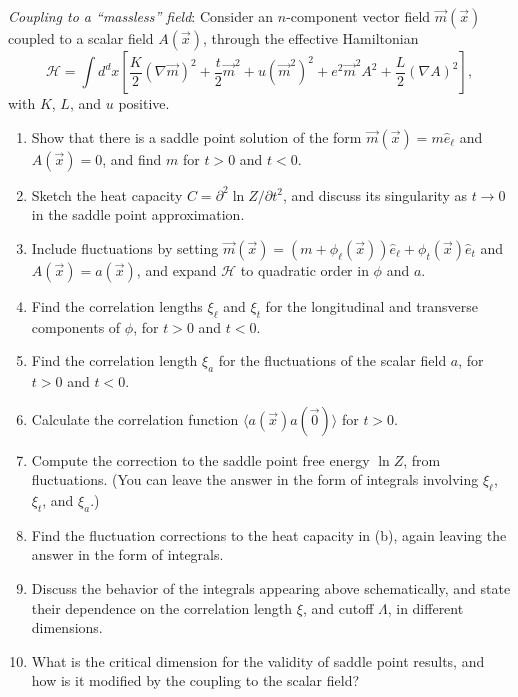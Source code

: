 \begin{problem}
    \textit{Coupling to a ``massless'' field}: Consider an $n$-component vector field $\vec{m}(\vec{x})$ coupled to a scalar field $A(\vec{x})$, through the effective Hamiltonian
    \[
        \mathcal{H} = \int d^dx\left[\frac{K}{2}(\nabla\vec{m})^2 + \frac{t}{2}\vec{m}^2 + u(\vec{m}^2)^2 + e^2\vec{m}^2 A^2 + \frac{L}{2}(\nabla A)^2\right],
    \]
    with $K$, $L$, and $u$ positive.

    \begin{enumerate}
        \item[(a)] Show that there is a saddle point solution of the form $\vec{m}(\vec{x}) = m\hat{e}_\ell$ and $A(\vec{x}) = 0$, and find $m$ for $t > 0$ and $t < 0$.

        \item[(b)] Sketch the heat capacity $C = \partial^2\ln Z/\partial t^2$, and discuss its singularity as $t \to 0$ in the saddle point approximation.

        \item[(c)] Include fluctuations by setting $\vec{m}(\vec{x}) = (m + \phi_\ell(\vec{x}))\hat{e}_\ell + \phi_t(\vec{x})\hat{e}_t$ and $A(\vec{x}) = a(\vec{x})$, and expand $\mathcal{H}$ to quadratic order in $\phi$ and $a$.

        \item[(d)] Find the correlation lengths $\xi_\ell$ and $\xi_t$ for the longitudinal and transverse components of $\phi$, for $t > 0$ and $t < 0$.

        \item[(e)] Find the correlation length $\xi_a$ for the fluctuations of the scalar field $a$, for $t > 0$ and $t < 0$.

        \item[(f)] Calculate the correlation function $\langle a(\vec{x})a(\vec{0})\rangle$ for $t > 0$.

        \item[(g)] Compute the correction to the saddle point free energy $\ln Z$, from fluctuations. (You can leave the answer in the form of integrals involving $\xi_\ell$, $\xi_t$, and $\xi_a$.)

        \item[(h)] Find the fluctuation corrections to the heat capacity in (b), again leaving the answer in the form of integrals.

        \item[(i)] Discuss the behavior of the integrals appearing above schematically, and state their dependence on the correlation length $\xi$, and cutoff $\Lambda$, in different dimensions.

        \item[(j)] What is the critical dimension for the validity of saddle point results, and how is it modified by the coupling to the scalar field?
    \end{enumerate}
\end{problem}

